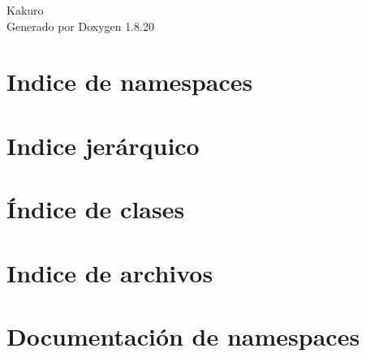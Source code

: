 \let\mypdfximage\pdfximage\def\pdfximage{\immediate\mypdfximage}\documentclass[twoside]{book}
\newcommand{\+}{\discretionary{\mbox{\scriptsize$\hookleftarrow$}}{}{}}
\newcommand{\clearemptydoublepage}{%
  \newpage{\pagestyle{empty}\cleardoublepage}%
}
\begin{document}
\hypersetup{pageanchor=false,
             bookmarksnumbered=true,
             pdfencoding=unicode
            }
\begin{titlepage}
\vspace*{7cm}
\begin{center}%
{\Large Kakuro }\\
\vspace*{1cm}
{\large Generado por Doxygen 1.8.20}\\
\end{center}
\end{titlepage}
\clearemptydoublepage
{}
\tableofcontents
\clearemptydoublepage
{}
\hypersetup{pageanchor=true}

\chapter{Indice de namespaces}

\chapter{Indice jerárquico}

\chapter{Índice de clases}

\chapter{Indice de archivos}

\chapter{Documentación de namespaces}






\end{document}
